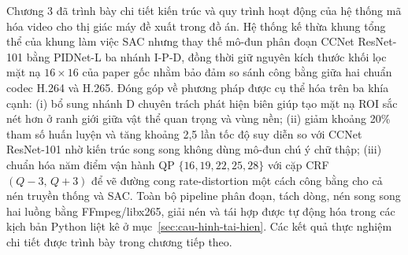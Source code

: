 Chương 3 đã trình bày chi tiết kiến trúc và quy trình hoạt động của hệ thống mã hóa video cho thị giác máy đề xuất trong đồ án. Hệ thống kế thừa khung tổng thể của khung làm việc SAC nhưng thay thế mô-đun phân đoạn CCNet ResNet-101 bằng PIDNet-L ba nhánh I-P-D, đồng thời giữ nguyên kích thước khối lọc mặt nạ $16\times16$ của paper gốc nhằm bảo đảm so sánh công bằng giữa hai chuẩn codec H.264 và H.265. Đóng góp về phương pháp được cụ thể hóa trên ba khía cạnh: (i) bổ sung nhánh D chuyên trách phát hiện biên giúp tạo mặt nạ ROI sắc nét hơn ở ranh giới giữa vật thể quan trọng và vùng nền; (ii) giảm khoảng 20\% tham số huấn luyện và tăng khoảng 2,5 lần tốc độ suy diễn so với CCNet ResNet-101 nhờ kiến trúc song song không dùng mô-đun chú ý chữ thập; (iii) chuẩn hóa năm điểm vận hành QP $\{16, 19, 22, 25, 28\}$ với cặp CRF $(Q-3,\,Q+3)$ để vẽ đường cong rate-distortion một cách công bằng cho cả nén truyền thống và SAC. Toàn bộ pipeline phân đoạn, tách dòng, nén song song hai luồng bằng FFmpeg/libx265, giải nén và tái hợp được tự động hóa trong các kịch bản Python liệt kê ở mục~\ref{sec:cau-hinh-tai-hien}. Các kết quả thực nghiệm chi tiết được trình bày trong chương tiếp theo.
